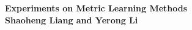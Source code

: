 \documentclass[a0,portrait]{a0poster}
\begin{document}
	
	
	
	\begin{minipage}[b]{0.75\linewidth}
		\veryHuge \color{NavyBlue} \textbf{Experiments on Metric Learning Methods} \color{Black}\\ %
		\huge \textbf{Shaoheng Liang and Yerong Li}\\[0.5cm] %
	\end{minipage}
	
	\vspace{1cm} %
	
	
\end{document}
